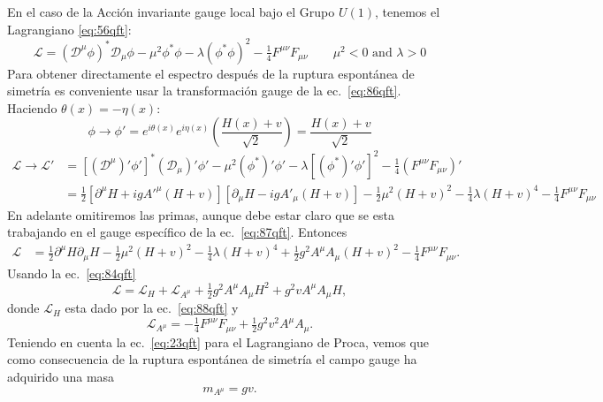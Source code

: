 \begin{frame}
En el caso de la Acción invariante gauge local bajo el Grupo $U(1)$, tenemos el Lagrangiano \eqref{eq:56qft}:
\begin{equation}
  \label{eq:89qft}
  \mathcal{L}=\left(\mathcal{D}^\mu\phi\right)^*\mathcal{D}_\mu\phi-\mu^2\phi^*\phi-\lambda\left(\phi^*\phi\right)^2-\tfrac{1}{4}F^{\mu\nu}F_{\mu\nu}
  \qquad 
  \mu^2\lt 0\text{ and } \lambda\gt 0
\end{equation}
Para obtener directamente el espectro después de la ruptura espontánea de simetría es conveniente usar la transformación gauge de la ec.~\eqref{eq:86qft}. Haciendo $\theta(x)=-\eta(x)$:
\begin{equation}
\label{eq:87qft}
   \phi\to\phi'=e^{i\theta(x)}e^{i\eta(x)}\left(\frac{H(x)+v}{\sqrt{2}}\right)=\frac{H(x)+v}{\sqrt{2}}
\end{equation}
\begin{align}
  \mathcal{L}\to\mathcal{L}' &=\left[\left(\mathcal{D}^\mu\right)'\phi'\right]^*\left(\mathcal{D}_\mu\right)'\phi'-\mu^2\left(\phi^*\right)'\phi'-\lambda\left[\left(\phi^*\right)'\phi'\right]^2-\tfrac{1}{4}\left(F^{\mu\nu}F_{\mu\nu}\right)'\nonumber\\
 &=\tfrac{1}{2}\left[\partial^\mu H+ig{A'}^\mu(H+v)\right]\left[\partial_\mu H-ig{A'}_\mu(H+v)\right]-\tfrac{1}{2}\mu^2(H+v)^2-\tfrac{1}{4}\lambda(H+v)^4-\tfrac{1}{4}F^{\mu\nu}F_{\mu\nu}
\end{align}
En adelante omitiremos las primas, aunque debe estar claro que se esta trabajando en el gauge específico de la ec.~\eqref{eq:87qft}. Entonces
\begin{align}
  \mathcal{L}&=\tfrac{1}{2}\partial^\mu H\partial_\mu H-\tfrac{1}{2}\mu^2(H+v)^2-
  \tfrac{1}{4}\lambda(H+v)^4+\tfrac{1}{2}g^2A^\mu A_\mu(H+v)^2
  -\tfrac{1}{4}F^{\mu\nu}F_{\mu\nu}.
\end{align}
Usando la ec.~\eqref{eq:84qft}
\begin{equation}
  \label{eq:94qft}
  \mathcal{L}=\mathcal{L}_H+\mathcal{L}_{A^\mu}+\tfrac{1}{2}g^2A^\mu A_\mu H^2+g^2vA^\mu A_\mu H,
\end{equation}
donde $\mathcal{L}_H$ esta dado por la ec.~\eqref{eq:88qft} y
\begin{equation}
  \mathcal{L}_{A^\mu}=-\tfrac{1}{4}F^{\mu\nu}F_{\mu\nu}+\tfrac{1}{2}g^2v^2A^\mu A_\mu.
\end{equation}
Teniendo en cuenta la ec.~\eqref{eq:23qft} para el Lagrangiano de Proca, vemos que como consecuencia de la ruptura espontánea de simetría el campo gauge ha adquirido una masa
\begin{equation}
  m_{A^\mu}=gv.
\end{equation}


\end{frame}

